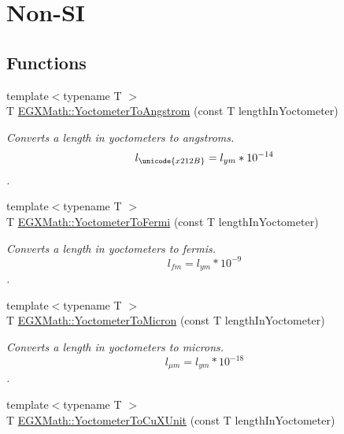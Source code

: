 \hypertarget{group___e_g_x_math-_conversions-_length_conversions-_yoctometer-_non-_s_i}{}\section{Non-\/\+SI}
\label{group___e_g_x_math-_conversions-_length_conversions-_yoctometer-_non-_s_i}
\subsection*{Functions}
\begin{DoxyCompactItemize}
\item 
{\footnotesize template$<$typename T $>$ }\\T \mbox{\hyperlink{group___e_g_x_math-_conversions-_length_conversions-_yoctometer-_non-_s_i_ga1189896c419175e90e23cea9d8f6b52a}{E\+G\+X\+Math\+::\+Yoctometer\+To\+Angstrom}} (const T length\+In\+Yoctometer)
\begin{DoxyCompactList}\small\item\em Converts a length in yoctometers to angstroms. \[ l_{\unicode{x212B}}=l_{ym} * 10^{-14} \]. \end{DoxyCompactList}\item 
{\footnotesize template$<$typename T $>$ }\\T \mbox{\hyperlink{group___e_g_x_math-_conversions-_length_conversions-_yoctometer-_non-_s_i_gadcf3b93b00bf0d160f27d3a1a4b8ed9f}{E\+G\+X\+Math\+::\+Yoctometer\+To\+Fermi}} (const T length\+In\+Yoctometer)
\begin{DoxyCompactList}\small\item\em Converts a length in yoctometers to fermis. \[ l_{fm}=l_{ym} * 10^{-9} \]. \end{DoxyCompactList}\item 
{\footnotesize template$<$typename T $>$ }\\T \mbox{\hyperlink{group___e_g_x_math-_conversions-_length_conversions-_yoctometer-_non-_s_i_ga4863fe4d5268ab023ec32d0281171b55}{E\+G\+X\+Math\+::\+Yoctometer\+To\+Micron}} (const T length\+In\+Yoctometer)
\begin{DoxyCompactList}\small\item\em Converts a length in yoctometers to microns. \[ l_{\mu m}=l_{ym} * 10^{-18} \]. \end{DoxyCompactList}\item 
{\footnotesize template$<$typename T $>$ }\\T \mbox{\hyperlink{group___e_g_x_math-_conversions-_length_conversions-_yoctometer-_non-_s_i_ga0266faf325ea86fef13391fb6e792ff8}{E\+G\+X\+Math\+::\+Yoctometer\+To\+Cu\+X\+Unit}} (const T length\+In\+Yoctometer)

\end{DoxyCompactItemize}
